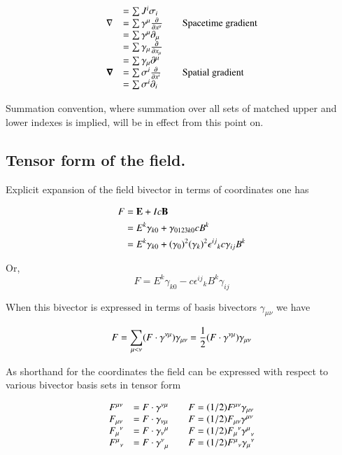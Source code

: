\documentclass{article}
\newcommand{\grad}[0]{\nabla}
\newcommand{\spacegrad}[0]{\boldsymbol{\nabla}}
\newcommand{\PD}[2]{\frac{\partial {#2}}{\partial {#1}}}
\begin{document}
\begin{equation*}
\begin{array}{l l l}
    &= \sum J^i \sigma_i \\
\grad &= \sum \gamma^{\mu} \PD{x^{\mu}}{} & \quad \mbox{Spacetime gradient} \\
      &= \sum \gamma^{\mu}\partial_{\mu} \\
      &= \sum \gamma_{\mu} \PD{x_{\mu}}{} \\
      &= \sum \gamma_{\mu}\partial^{\mu} \\
\spacegrad &= \sum \sigma^{i} \PD{x^{i}}{} & \quad \mbox{Spatial gradient} \\
           &= \sum \sigma^{i}\partial_{i} \\
\end{array}
\end{equation*}

Summation convention, where summation over all sets of matched upper and lower indexes is implied, will be in effect from this point on.

\subsection{ Tensor form of the field. } 

Explicit expansion of the field bivector in terms of coordinates one has

\begin{align*}
F 
&= \mathbf{E} + I c \mathbf{B} \\
&= E^k \gamma_{k0} + \gamma_{0123k0} c B^k \\
&= E^k \gamma_{k0} + {(\gamma_{0})}^2 {(\gamma_{k})}^2 {\epsilon^{ij}}_k c \gamma_{ij} B^k \\
\end{align*}

Or,
\begin{equation}
F = E^k \gamma_{k0} - c {\epsilon^{ij}}_k B^k \gamma_{ij}
\end{equation}

When this bivector is expressed in terms of basis bivectors $\gamma_{\mu\nu}$ we have

\begin{align*}
F 
= \sum_{\mu<\nu} (F \cdot \gamma^{\nu\mu}) \gamma_{\mu\nu}
= \frac{1}{2} (F \cdot \gamma^{\nu\mu}) \gamma_{\mu\nu} 
\end{align*}

As shorthand for the coordinates the field can be expressed with respect to various bivector basis sets in tensor form

\begin{equation*}
\begin{array}{l l l}
F^{\mu\nu} &= F \cdot \gamma^{\nu\mu} & \quad F = (1/2) F^{\mu\nu} \gamma_{\mu\nu} \\
F_{\mu\nu} &= F \cdot \gamma_{\nu\mu} & \quad F = (1/2) F_{\mu\nu} \gamma^{\mu\nu} \\
{F_{\mu}}^\nu &= F \cdot {\gamma_{\nu}}^{\mu} & \quad F = (1/2) {F_{\mu}}^{\nu} {\gamma^{\mu}}_{\nu} \\
{F^{\mu}}_\nu &= F \cdot {\gamma^{\nu}}_{\mu} & \quad F = (1/2) {F^{\mu}}_{\nu} {\gamma_{\mu}}^{\nu}
\end{array}
\end{equation*}
\end{document}

